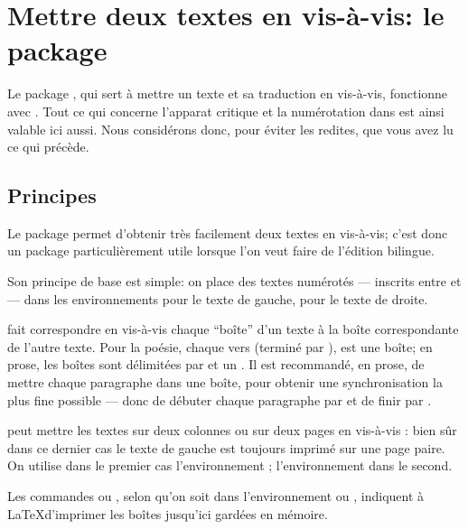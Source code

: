  






\section{Mettre deux textes en vis-à-vis: le package }

\begin{prealable}
Le package , qui sert à mettre un texte et sa traduction en vis-à-vis, fonctionne avec . Tout ce qui concerne l'apparat critique et la numérotation dans  est ainsi valable ici aussi. Nous considérons donc, pour éviter les redites, que vous avez lu ce qui précède.
\end{prealable}


\subsection{Principes}

Le package  permet d'obtenir très facilement deux textes en vis-à-vis; c'est donc un package particulièrement utile lorsque l'on veut faire de l'édition bilingue.

Son principe de base est simple: on place des textes numérotés --- inscrits entre  et   --- dans les environnements  pour le texte de gauche,   pour le texte de droite.

 fait correspondre en vis-à-vis chaque \enquote{boîte} d'un texte à la boîte correspondante de l'autre texte. Pour la poésie,  chaque vers  (terminé par \ampersand ), est une boîte;  en prose, les boîtes sont délimitées par   et un .  Il est recommandé, en prose, de mettre chaque paragraphe dans une boîte, pour obtenir une synchronisation la plus fine possible --- donc de débuter chaque paragraphe par  et de finir par . 


 peut mettre les textes sur deux colonnes ou sur deux pages en vis-à-vis : bien sûr dans ce dernier  cas le texte de gauche est toujours imprimé sur une page paire.
On utilise dans le premier cas l'environnement  ; l'environnement  dans le second.

Les commandes  ou , selon qu'on soit dans l'environnement  ou , indiquent à \LaTeX  d'imprimer les boîtes jusqu'ici gardées en mémoire. 



